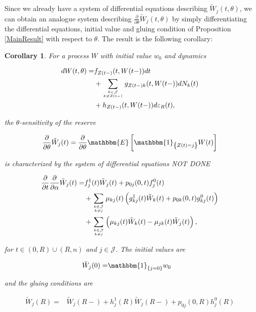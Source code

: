 \documentclass{article}
\newcommand{\1}[1]{\mathbbm{1}_{\left\lbrace #1 \right\rbrace}}
\newcommand{\expec}[1][def]{\mathbbm{E} \left[ #1 \right]}
\theoremstyle{break}
\newtheorem{corollary}[definition]{Corollary}
\theoremstyle{remark}
\numberwithin{equation}{section}
\begin{document}
Since we already have a system of differential equations describing $\tilde{W}_j(t,\theta)$, we can obtain an analogue system describing $\frac{\partial}{\partial \theta} \tilde{W}_j(t,\theta)$ by simply differentiating the differential equations, initial value and gluing condition of Proposition \ref{MainResult} with respect to $\theta$. The result is the following corollary:

\begin{corollary} \label{Corollary}
	For a process $W$ with initial value $w_0$ and dynamics
	
	\begin{align*}
		dW(t,\theta) =& f_{Z(t-)}(t,W(t-)) dt \\
		&+ \sum_{k \in \mathcal{J} \atop k \neq Z(t-)} g_{Z(t-)k}(t,W(t-)) dN_{k}(t) \\
		&+ h_{Z(t-)}(t,W(t-)) d \varepsilon_R(t),
	\end{align*}

	the $\theta$-sensitivity of the reserve
	
	\begin{align*}
		\frac{\partial}{\partial \theta} \tilde{W}_j(t) = \frac{\partial}{\partial \theta} \expec[\1{Z(t)=j} W(t)]
	\end{align*}
	
	is characterized by the system of differential equations NOT DONE
	
	\begin{align*}
		\frac{\partial}{\partial t} \frac{\partial}{\partial \alpha} \tilde{W}_j(t) =& f_j^1(t) \tilde{W}_j(t) + p_{0j}(0,t) f_j^0(t) \\
		&+ \sum_{k \in \mathcal{J} \atop k \neq j} \mu_{kj}(t) \left( g_{kj}^1(t) \tilde{W}_k(t) + p_{0k}(0,t) g_{kj}^0(t) \right) \\
		&+ \sum_{k \in \mathcal{J} \atop k \neq j} \left( \mu_{kj}(t) \tilde{W}_k(t) - \mu_{jk}(t) \tilde{W}_j(t) \right),
	\end{align*}
	
	for $t \in (0,R)\cup(R,n)$ and $j \in \mathcal{J}$. The initial values are
	
	\begin{align*}
		\tilde{W}_j(0) =& \1{j=0} w_0
	\end{align*}
	
	and the gluing conditions are
	
	\begin{align*}
		\tilde{W}_j(R) =& \tilde{W}_j(R-) + h_j^1(R) \tilde{W}_j(R-) + p_{0j}(0,R) h_j^0(R)
	\end{align*}
\end{corollary}
\end{document}
